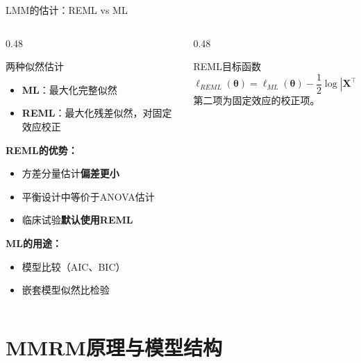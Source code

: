 \documentclass[aspectratio=169,11pt]{beamer}
\newcommand{\bX}{\mathbf{X}}
\newcommand{\btheta}{\boldsymbol{\theta}}
\newcommand{\bSigma}{\boldsymbol{\Sigma}}
\begin{document}
\begin{frame}{LMM的估计：REML vs ML}
\begin{columns}[T,totalwidth=\textwidth]
\begin{column}{0.48\textwidth}
\begin{block}{两种似然估计}
\begin{itemize}
    \item \textbf{ML}：最大化完整似然
    \item \textbf{REML}：最大化残差似然，对固定效应校正
\end{itemize}
\end{block}

\textbf{REML的优势：}
\begin{itemize}
    \item 方差分量估计\textbf{偏差更小}
    \item 平衡设计中等价于ANOVA估计
    \item 临床试验\textbf{默认使用REML}
\end{itemize}

\textbf{ML的用途：}
\begin{itemize}
    \item 模型比较（AIC、BIC）
    \item 嵌套模型似然比检验
\end{itemize}
\end{column}
\begin{column}{0.48\textwidth}
\begin{exampleblock}{REML目标函数}
\[
\ell_{REML}(\btheta) = \ell_{ML}(\btheta) - \frac{1}{2} \log |\bX^\top \bSigma^{-1} \bX|
\]
\vspace{0.1cm}
第二项为固定效应的校正项。
\end{exampleblock}
\end{column}
\end{columns}
\end{frame}

\section{MMRM原理与模型结构}
\end{document}
